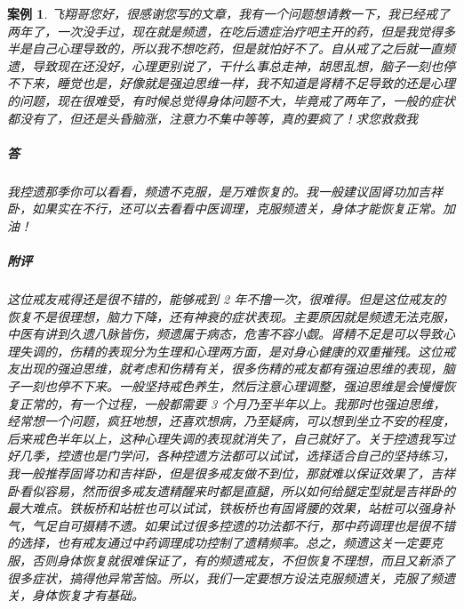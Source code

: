 \documentclass{ctexart}
\newtheorem{case}{案例}
\begin{document}
\begin{case}
    飞翔哥您好，很感谢您写的文章，我有一个问题想请教一下，我已经戒了两年了，一次没手过，现在就是频遗，在吃后遗症治疗吧主开的药，但是我觉得多半是自己心理导致的，所以我不想吃药，但是就怕好不了。自从戒了之后就一直频遗，导致现在还没好，心理更别说了，干什么事总走神，胡思乱想，脑子一刻也停不下来，睡觉也是，好像就是强迫思维一样，我不知道是肾精不足导致的还是心理的问题，现在很难受，有时候总觉得身体问题不大，毕竟戒了两年了，一般的症状都没有了，但还是头昏脑涨，注意力不集中等等，真的要疯了！求您救救我
    \subparagraph{答} 我控遗那季你可以看看，频遗不克服，是万难恢复的。我一般建议固肾功加吉祥卧，如果实在不行，还可以去看看中医调理，克服频遗关，身体才能恢复正常。加油！
    \subparagraph{附评} 这位戒友戒得还是很不错的，能够戒到 2 年不撸一次，很难得。但是这位戒友的恢复不是很理想，脑力下降，还有神衰的症状表现。主要原因就是频遗无法克服，中医有讲到久遗八脉皆伤，频遗属于病态，危害不容小觑。肾精不足是可以导致心理失调的，伤精的表现分为生理和心理两方面，是对身心健康的双重摧残。这位戒友出现的强迫思维，就考虑和伤精有关，很多伤精的戒友都有强迫思维的表现，脑子一刻也停不下来。一般坚持戒色养生，然后注意心理调整，强迫思维是会慢慢恢复正常的，有一个过程，一般都需要 3 个月乃至半年以上。我那时也强迫思维，经常想一个问题，疯狂地想，还喜欢想病，乃至疑病，可以想到坐立不安的程度，后来戒色半年以上，这种心理失调的表现就消失了，自己就好了。关于控遗我写过好几季，控遗也是门学问，各种控遗方法都可以试试，选择适合自己的坚持练习，我一般推荐固肾功和吉祥卧，但是很多戒友做不到位，那就难以保证效果了，吉祥卧看似容易，然而很多戒友遗精醒来时都是直腿，所以如何给腿定型就是吉祥卧的最大难点。铁板桥和站桩也可以试试，铁板桥也有固肾腰的效果，站桩可以强身补气，气足自可摄精不遗。如果试过很多控遗的功法都不行，那中药调理也是很不错的选择，也有戒友通过中药调理成功控制了遗精频率。总之，频遗这关一定要克服，否则身体恢复就很难保证了，有的频遗戒友，不但恢复不理想，而且又新添了很多症状，搞得他异常苦恼。所以，我们一定要想方设法克服频遗关，克服了频遗关，身体恢复才有基础。
\end{case}
\end{document}
